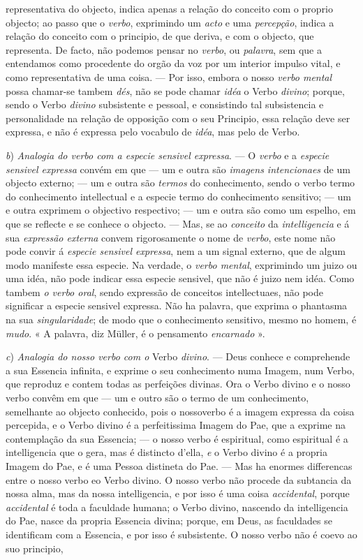 representativa do objecto, indica apenas a relação do conceito com o proprio objecto; ao passo que o \emph{verbo}, exprimindo um \emph{acto} e uma \emph{percepção}, indica a relação do conceito com o principio, de que deriva, e com o objecto, que representa. De facto, não podemos pensar no \emph{verbo}, ou \emph{palavra}, sem que a entendamos como procedente do orgão da voz por um interior impulso vital, e como representativa de uma coisa. --- Por isso, embora o nosso \emph{verbo mental} possa chamar-se tambem \emph{dés}, não se pode chamar \emph{idéa} o Verbo \emph{divino}; porque, sendo o Verbo \emph{divino} subsistente e pessoal, e consistindo tal subsistencia e personalidade na relação de opposição com o seu Principio, essa relação deve ser expressa, e não é expressa pelo vocabulo de \emph{idéa}, mas pelo de Verbo.\par \emph{b}) \emph{Analogia do verbo com a especie sensivel expressa}. --- O \emph{verbo} e a \emph{especie sensivel expressa} convém em que --- um e outra são \emph{imagens intencionaes} de um objecto externo; --- um e outra são \emph{termos} do conhecimento, sendo o verbo termo do conhecimento intellectual e a especie termo do conhecimento sensitivo; --- um e outra exprimem o objectivo respectivo; --- um e outra são como um espelho, em que se reflecte e se conhece o objecto. --- Mas, se ao \emph{conceito} da \emph{intelligencia} e á sua \emph{expressão externa} convem rigorosamente o nome de \emph{verbo}, este nome não pode convir á \emph{especie sensivel expressa}, nem a um signal externo, que de algum modo manifeste essa especie. Na verdade, o \emph{verbo mental}, exprimindo um juizo ou uma idéa, não pode indicar essa especie sensivel, que não é juizo nem idéa. Como tambem \emph{o verbo oral}, sendo expressão de conceitos intellectuaes, não pode significar a especie sensivel expressa. Não ha palavra, que exprima o phantasma na sua \emph{singularidade}; de modo que o conhecimento sensitivo, mesmo no homem, é \emph{mudo}. « A palavra, diz Müller, é o pensamento \emph{encarnado} ».\par \emph{c}) \emph{Analogia do nosso verbo com o} Verbo \emph{divino}. --- Deus conhece e comprehende a sua Essencia infinita, e exprime o seu conhecimento numa Imagem, num Verbo, que reproduz e contem todas as perfeições divinas. Ora o Verbo divino e o nosso verbo convêm em que --- um e outro são o termo de um conhecimento, semelhante ao objecto conhecido, pois o nossoverbo é a imagem expressa da coisa percepida, e o Verbo divino é a perfeitissima Imagem do Pae, que a exprime na contemplação da sua Essencia; --- o nosso verbo é espiritual, como espiritual é a intelligencia que o gera, mas é distincto d'ella, \emph{e} o Verbo divino é a propria Imagem do Pae, e é uma Pessoa distineta do Pae. --- Mas ha enormes differencas entre o nosso verbo eo Verbo divino. O nosso verbo não procede da subtancia da nossa alma, mas da nossa intelligencia, e por isso é uma coisa \emph{accidental}, porque \emph{accidental} é toda a faculdade humana; o Verbo divino, nascendo da intelligencia do Pae, nasce da propria Essencia divina; porque, em Deus, as faculdades se identificam com a Essencia, e por isso é subsistente. O nosso verbo não é coevo ao suo principio, 